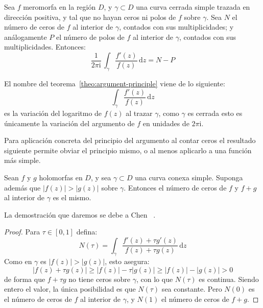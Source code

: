   \begin{theorem}
    \label{theo:argument-principle}
    Sea \(f\) meromorfa en la región \(D\),
    y \(\gamma \subset D\) una curva cerrada simple
    trazada en dirección positiva,
    y tal que no hayan ceros ni polos de \(f\) sobre \(\gamma\).
    Sea \(N\) el número de ceros de \(f\) al interior de \(\gamma\),
    contados con sus multiplicidades;
    y análogamente \(P\)
    el número de polos de \(f\) al interior de \(\gamma\),
    contados con sus multiplicidades.
    Entonces:
    \begin{equation}
      \label{eq:argument-principle}
      \frac{1}{2 \pi \mathrm{i}} \,
	\int_\gamma \frac{f'(z)}{f(z)} \, \mathrm{d} z
	= N - P
    \end{equation}
  \end{theorem}
  El nombre del teorema~\eqref{theo:argument-principle}
  viene de lo siguiente:
  \begin{equation*}
    \int_\gamma \frac{f'(z)}{f(z)} \, \mathrm{d} z
  \end{equation*}
  es la variación del logaritmo de \(f(z)\) al trazar \(\gamma\),
  como \(\gamma\) es cerrada
  esto es únicamente la variación del argumento de \(f\)
  en unidades de \(2 \pi \mathrm{i}\).

  Para aplicación concreta del principio del argumento
  al contar ceros
  el resultado siguiente permite obviar el principio mismo,
  o al menos aplicarlo a una función más simple.
  \begin{theorem}[Rouché]
    \label{theo:Rouche}
    Sean \(f\) y \(g\) holomorfas en \(D\),
    y sea \(\gamma \subset D\) una curva conexa simple.
    Suponga además que \(\lvert f(z) \rvert > \lvert g(z) \rvert\)
    sobre \(\gamma\).
    Entonces el número de ceros de \(f\) y \(f + g\)
    al interior de \(\gamma\) es el mismo.
  \end{theorem}
  La demostración que daremos se debe a Chen~%
      \cite{chen08:_intro_complex_anal}.
  \begin{proof}
    Para \(\tau \in [0, 1]\) defina:
    \begin{equation*}
      N(\tau)
	= \int_\gamma \frac{f'(z) + \tau g'(z)}{f(z) + \tau g(z)}
	    \, \mathrm{d} z
    \end{equation*}
    Como en \(\gamma\)
    es \(\lvert f(z) \rvert > \lvert g(z) \rvert\),
    esto asegura:
    \begin{equation*}
      \lvert f(z) + \tau g(z) \rvert
	\ge \lvert f(z) \rvert - \tau \lvert g(z) \rvert
	\ge \lvert f(z) \rvert - \lvert g(z) \rvert
	> 0
    \end{equation*}
    de forma que \(f + \tau g\) no tiene ceros sobre \(\gamma\),
    con lo que \(N(\tau)\) es continua.
    Siendo entero el valor,
    la única posibilidad es que \(N(\tau)\) sea constante.
    Pero \(N(0)\) es el número de ceros de \(f\)
    al interior de \(\gamma\),
    y \(N(1)\) el número de ceros de \(f + g\).
  \end{proof}

